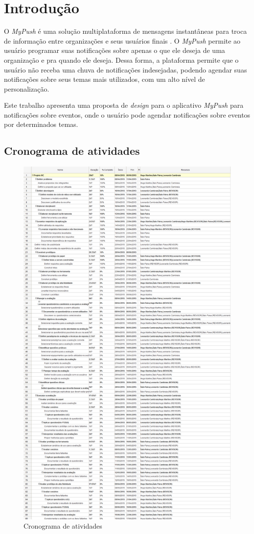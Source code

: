 \chapter[Introdução]{Introdução}
  
  O \textit{MyPush} é uma solução multiplataforma de mensagens instantâneas para troca de informação entre organizações
  e seus usuários finais \cite{cedro15}. O \textit{MyPush} permite ao usuário programar suas notificações sobre apenas o que
  ele deseja de uma organização e pra quando ele deseja. Dessa forma, a plataforma permite que o usuário não receba uma chuva
  de notificações indesejadas, podendo agendar suas notificações sobre seus temas mais utilizados, com um alto nível de
  personalização.
  
  Este trabalho apresenta uma proposta de \textit{design} para o aplicativo \textit{MyPush} para notificações sobre eventos, 
  onde o usuário pode agendar notificações sobre eventos por determinados temas.
  
  \pagebreak
  \section{Cronograma de atividades}
    
    \begin{figure}[!htbp]
      \centering
      \includegraphics[scale=0.3]{editaveis/figuras/cronograma}
      \caption{Cronograma de atividades}
      \label{cronograma}
    \end{figure}




